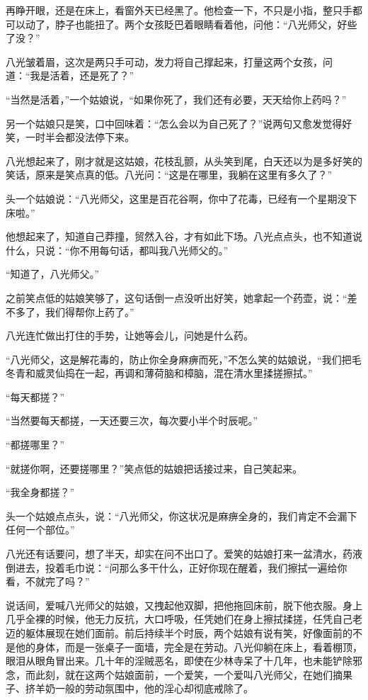 再睁开眼，还是在床上，看窗外天已经黑了。他检查一下，不只是小指，整只手都可以动了，脖子也能扭了。两个女孩眨巴着眼睛看着他，问他：“八光师父，好些了没？”

八光皱着眉，这次是两只手可动，发力将自己撑起来，打量这两个女孩，问道：“我是活着，还是死了？”

“当然是活着，”一个姑娘说，“如果你死了，我们还有必要，天天给你上药吗？”

另一个姑娘只是笑，口中回味着：“怎么会以为自己死了？”说两句又愈发觉得好笑，一时半会都没法停下来。

八光想起来了，刚才就是这姑娘，花枝乱颤，从头笑到尾，白天还以为是多好笑的笑话，原来是笑点真的低。八光问：“这是在哪里，我躺在这里有多久了？”

头一个姑娘说：“八光师父，这里是百花谷啊，你中了花毒，已经有一个星期没下床啦。”

他想起来了，知道自己莽撞，贸然入谷，才有如此下场。八光点点头，也不知道说什么，只说：“你不用每句话，都叫我八光师父的。”

“知道了，八光师父。”

之前笑点低的姑娘笑够了，这句话倒一点没听出好笑，她拿起一个药壶，说：“差不多了，我们得帮你上药了。”

八光连忙做出打住的手势，让她等会儿，问她是什么药。

“八光师父，这是解花毒的，防止你全身麻痹而死，”不怎么笑的姑娘说，“我们把毛冬青和威灵仙捣在一起，再调和薄荷脑和樟脑，混在清水里揉搓擦拭。”

“每天都搓？”

“当然要每天都搓，一天还要三次，每次要小半个时辰呢。”

“都搓哪里？” 

“就搓你啊，还要搓哪里？”笑点低的姑娘把话接过来，自己笑起来。

“我全身都搓？”

头一个姑娘点点头，说：“八光师父，你这状况是麻痹全身的，我们肯定不会漏下任何一个部位。”

八光还有话要问，想了半天，却实在问不出口了。爱笑的姑娘打来一盆清水，药液倒进去，投着毛巾说：“问那么多干什么，正好你现在醒着，我们擦拭一遍给你看，不就完了吗？”

说话间，爱喊八光师父的姑娘，又拽起他双脚，把他拖回床前，脱下他衣服。身上几乎全裸的时候，他无力反抗，大口呼吸，任凭她们在身上擦拭揉搓，任凭自己老迈的躯体展现在她们面前。前后持续半个时辰，两个姑娘有说有笑，好像面前的不是他的身体，而是一张桌子一面墙，完全是在劳动。八光仰躺在床上，看着棚顶，眼泪从眼角冒出来。几十年的淫贼恶名，即使在少林寺呆了十几年，也未能铲除邪念，而此刻，就在这两个姑娘面前，一个爱笑，一个爱叫八光师父，在她们摘果子、挤羊奶一般的劳动氛围中，他的淫心却彻底戒除了。
\newline

